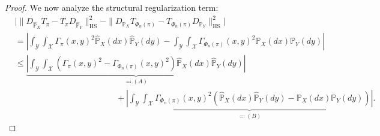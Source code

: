\documentclass{article}
\theoremstyle{plain}
\theoremstyle{definition}
\theoremstyle{remark}
\begin{document}
\begin{proof}
	We now analyze the structural regularization term:
	\begin{align*}
		&\Big\vert \|D_{\hat{\mathbb{P}}_X} T_{\pi} - T_{\pi} D_{\hat{\mathbb{P}}_Y} \|_{\mathrm{HS}}^2 - \|D_{\mathbb{P}_X} T_{\Phi_n(\pi)} - T_{\Phi_n(\pi)} D_{\mathbb{P}_Y} \|_{\mathrm{HS}}^2 \Big\vert \\
		&= \left\vert \int_{\mathcal{Y}}\int_{\mathcal{X}} \Gamma_{\pi}(x,y)^2\hat{\mathbb{P}}_X(dx)\hat{\mathbb{P}}_Y(dy) - \int_{\mathcal{Y}}\int_{\mathcal{X}} \Gamma_{\Phi_n(\pi)}(x,y)^2 \mathbb{P}_X(dx)\mathbb{P}_Y(dy) \right\vert \\
		&\leq \underbrace{\left\vert \int_{\mathcal{Y}}\int_{\mathcal{X}} (\Gamma_{\pi}(x,y)^2 - \Gamma_{\Phi_n(\pi)}(x,y)^2)\hat{\mathbb{P}}_X(dx)\hat{\mathbb{P}}_Y(dy) \right\vert}_{\eqqcolon (A)} \\
		&\qquad\qquad\qquad\qquad\qquad\qquad + \underbrace{\left\vert \int_{\mathcal{Y}}\int_{\mathcal{X}} \Gamma_{\Phi_n(\pi)}(x,y)^2 (\hat{\mathbb{P}}_X(dx)\hat{\mathbb{P}}_Y(dy) - \mathbb{P}_X(dx)\mathbb{P}_Y(dy)) \right\vert}_{\eqqcolon (B)} .
	\end{align*}
	

\end{proof}
\end{document}
